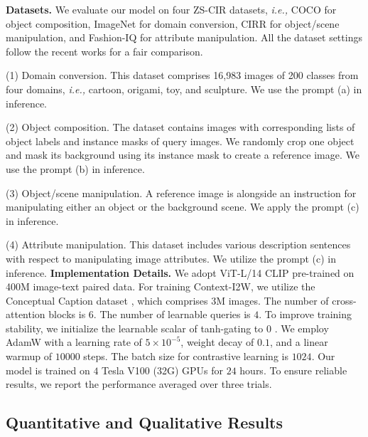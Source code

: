 \documentclass[letterpaper]{article} \usepackage{aaai24}  \usepackage{times}  \usepackage{helvet}  \usepackage{courier}  \usepackage[hyphens]{url}  \usepackage{graphicx} \urlstyle{rm} \def\UrlFont{\rm}  \usepackage{natbib}  \usepackage{caption} \frenchspacing  \setlength{\pdfpagewidth}{8.5in} \setlength{\pdfpageheight}{11in} \usepackage{algorithm}
\begin{document}
\noindent \textbf{Datasets.} We evaluate our model on four ZS-CIR datasets, \textit{i.e.,} COCO \cite{10.1007/978-3-319-10602-1_48} for object composition, ImageNet \cite{deng2009imagenet, Hendrycks_2021_ICCV} for domain conversion, CIRR \cite{Liu_2021_ICCV} for object/scene manipulation, and Fashion-IQ \cite{Wu_2021_CVPR} for attribute manipulation. All the dataset settings follow the recent works \cite{Saito_2023_CVPR, baldrati2023zero} for a fair comparison. 


\noindent (1) Domain conversion. 
This dataset comprises 16,983 images of 200 classes from four domains, \textit{i.e.,} cartoon, origami, toy, and sculpture. We use the prompt (a) in inference. 

\noindent (2) Object composition. The dataset contains images with corresponding lists of object labels and instance masks of query images. We randomly crop one object and mask its background using its instance mask to create a reference image. We use the prompt (b) in inference. 

\noindent (3) Object/scene manipulation. A reference image is alongside an instruction for manipulating either an object or the background scene. We apply the prompt (c) in inference. 

\noindent (4) Attribute manipulation. This dataset includes various description sentences with respect to manipulating image attributes. We utilize the prompt (c) in inference. 
\noindent \textbf{Implementation Details.} We adopt ViT-L/14 CLIP \cite{radford2021learning} pre-trained on 400M image-text paired data. For training Context-I2W, we utilize the Conceptual Caption dataset \cite{DBLP:conf/acl/SoricutDSG18}, which comprises 3M images. The number of cross-attention blocks is $6$. The number of learnable queries is $4$. To improve training stability, we initialize the learnable scalar of tanh-gating to 0 \cite{bachlechner2021rezero}. We employ AdamW \cite{loshchilov2018decoupled} with a learning rate of $5\times10^{-5}$, weight decay of $0.1$, and a linear warmup of $10000$ steps. The batch size for contrastive learning is $1024$. Our model is trained on $4$ Tesla V100 (32G) GPUs for $24$ hours. To ensure reliable results, we report the performance averaged over three trials.

\subsection{Quantitative and Qualitative Results}
\end{document}
